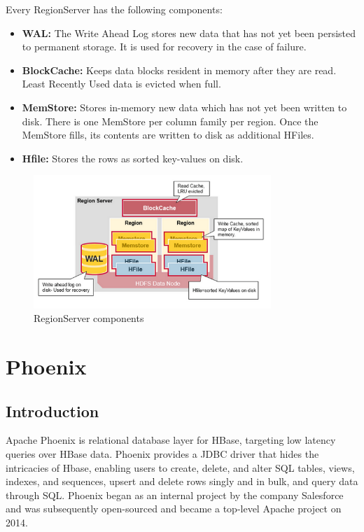 Every RegionServer has the following components:
\begin{itemize}
\item \textbf{WAL:} The Write Ahead Log stores new data that has not yet been persisted to permanent storage. It is used for recovery in the case of failure.
\item \textbf{BlockCache:} Keeps data blocks resident in memory after they are read. Least Recently Used data is evicted when full.
\item \textbf{MemStore:} Stores in-memory new data which has not yet been written to disk. There is one MemStore per column family per region. Once the MemStore fills, its contents are written to disk as additional HFiles.
\item \textbf{Hfile:} Stores the rows as sorted key-values on disk.
\end{itemize}

\begin{figure}[h!]
\centering
\includegraphics[width=0.8\textwidth]{figures/hbase_regionserver_components}
\caption{RegionServer components}
\label{figure:hbase_regionserver_components}
\end{figure}


\section{Phoenix}

\subsection{Introduction}

Apache Phoenix \cite{phoenix} is relational database layer for HBase, targeting low latency queries over HBase data. Phoenix provides a JDBC driver that hides the intricacies of Hbase, enabling users to create, delete, and alter SQL tables, views, indexes, and sequences, upsert and delete rows singly and in bulk, and query data through SQL. Phoenix began as an internal project by the company Salesforce and was subsequently open-sourced and became a top-level Apache project on 2014.

